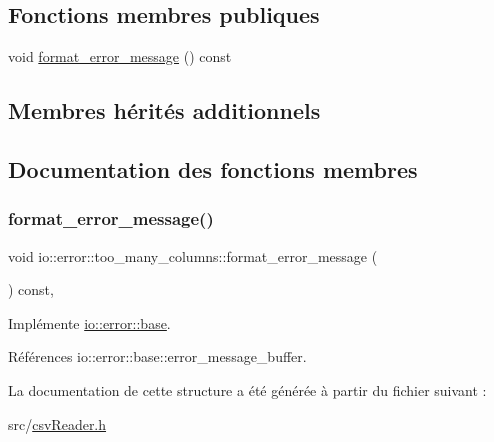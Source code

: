 \subsection*{Fonctions membres publiques}
\begin{DoxyCompactItemize}
\item 
void \hyperlink{structio_1_1error_1_1too__many__columns_a2072af07b0408387579becc076a9809e}{format\+\_\+error\+\_\+message} () const
\end{DoxyCompactItemize}
\subsection*{Membres hérités additionnels}


\subsection{Documentation des fonctions membres}
\mbox{\label{structio_1_1error_1_1too__many__columns_a2072af07b0408387579becc076a9809e}} 
\subsubsection{\texorpdfstring{format\+\_\+error\+\_\+message()}{format\_error\_message()}}
{\footnotesize\ttfamily void io\+::error\+::too\+\_\+many\+\_\+columns\+::format\+\_\+error\+\_\+message (\begin{DoxyParamCaption}{ }\end{DoxyParamCaption}) const\hspace{0.3cm}{\ttfamily [inline]}, {\ttfamily [virtual]}}



Implémente \hyperlink{structio_1_1error_1_1base_a7d9ff6a31b716a24f056cf8a3e15191d}{io\+::error\+::base}.



Références io\+::error\+::base\+::error\+\_\+message\+\_\+buffer.



La documentation de cette structure a été générée à partir du fichier suivant \+:\begin{DoxyCompactItemize}
\item 
src/\hyperlink{csvReader_8h}{csv\+Reader.\+h}\end{DoxyCompactItemize}
